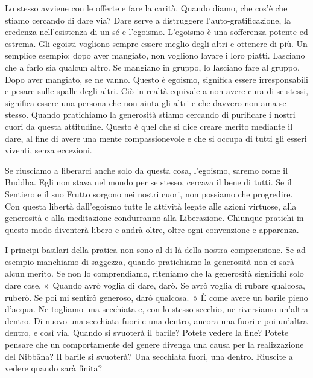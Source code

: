 Lo stesso avviene con le offerte e fare la carità. Quando diamo, che
cos'è che stiamo cercando di dare via? Dare serve a distruggere
l'auto-gratificazione, la credenza nell'esistenza di un sé e l'egoismo.
L'egoismo è una sofferenza potente ed estrema. Gli egoisti vogliono
sempre essere meglio degli altri e ottenere di più. Un semplice esempio:
dopo aver mangiato, non vogliono lavare i loro piatti. Lasciano che a
farlo sia qualcun altro. Se mangiano in gruppo, lo lasciano fare al
gruppo. Dopo aver mangiato, se ne vanno. Questo è egoismo, significa
essere irresponsabili e pesare sulle spalle degli altri. Ciò in realtà
equivale a non avere cura di se stessi, significa essere una persona che
non aiuta gli altri e che davvero non ama se stesso. Quando pratichiamo
la generosità stiamo cercando di purificare i nostri cuori da questa
attitudine. Questo è quel che si dice creare merito mediante il dare, al
fine di avere una mente compassionevole e che si occupa di tutti gli
esseri viventi, senza eccezioni.

Se riusciamo a liberarci anche solo da questa cosa, l'egoismo, saremo
come il Buddha. Egli non stava nel mondo per se stesso, cercava il bene
di tutti. Se il Sentiero e il suo Frutto sorgono nei nostri cuori, non
possiamo che progredire. Con questa libertà dall'egoismo tutte le
attività legate alle azioni virtuose, alla generosità e alla meditazione
condurranno alla Liberazione. Chiunque pratichi in questo modo diventerà
libero e andrà oltre, oltre ogni convenzione e apparenza.

I principi basilari della pratica non sono al di là della nostra
comprensione. Se ad esempio manchiamo di saggezza, quando pratichiamo la
generosità non ci sarà alcun merito. Se non lo comprendiamo, riteniamo
che la generosità significhi solo dare cose. «~Quando avrò voglia di
dare, darò. Se avrò voglia di rubare qualcosa, ruberò. Se poi mi sentirò
generoso, darò qualcosa.~» È come avere un barile pieno d'acqua. Ne
togliamo una secchiata e, con lo stesso secchio, ne riversiamo un'altra
dentro. Di nuovo una secchiata fuori e una dentro, ancora una fuori e
poi un'altra dentro, e così via. Quando si svuoterà il barile? Potete
vedere la fine? Potete pensare che un comportamente del genere divenga
una causa per la realizzazione del Nibbāna? Il barile si
svuoterà? Una secchiata fuori, una dentro. Riuscite a vedere quando sarà
finita?

\enlargethispage{\baselineskip}

